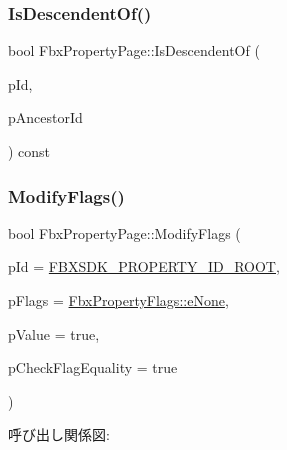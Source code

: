 \subsubsection{\texorpdfstring{Is\+Descendent\+Of()}{IsDescendentOf()}}
{\footnotesize\ttfamily bool Fbx\+Property\+Page\+::\+Is\+Descendent\+Of (\begin{DoxyParamCaption}\item[{\hyperlink{fbxtypes_8h_a088fa96de3b0b3ea69f0f6afef525dfb}{Fbx\+Int}}]{p\+Id,  }\item[{\hyperlink{fbxtypes_8h_a088fa96de3b0b3ea69f0f6afef525dfb}{Fbx\+Int}}]{p\+Ancestor\+Id }\end{DoxyParamCaption}) const}

\mbox{\label{class_fbx_property_page_a74f788300f24f87da57f6e3d7cad5eea}} 
\subsubsection{\texorpdfstring{Modify\+Flags()}{ModifyFlags()}}
{\footnotesize\ttfamily bool Fbx\+Property\+Page\+::\+Modify\+Flags (\begin{DoxyParamCaption}\item[{\hyperlink{fbxtypes_8h_a088fa96de3b0b3ea69f0f6afef525dfb}{Fbx\+Int}}]{p\+Id = {\ttfamily \hyperlink{fbxpropertydef_8h_a291bdb6d8428dce8463143fa3aba2c34}{F\+B\+X\+S\+D\+K\+\_\+\+P\+R\+O\+P\+E\+R\+T\+Y\+\_\+\+I\+D\+\_\+\+R\+O\+OT}},  }\item[{\hyperlink{class_fbx_property_flags_afabfa7e0949aac8a7dcdf8a141867e99}{Fbx\+Property\+Flags\+::\+E\+Flags}}]{p\+Flags = {\ttfamily \hyperlink{class_fbx_property_flags_afabfa7e0949aac8a7dcdf8a141867e99ac1b9aab93d40af76eb419be426de17b1}{Fbx\+Property\+Flags\+::e\+None}},  }\item[{bool}]{p\+Value = {\ttfamily true},  }\item[{bool}]{p\+Check\+Flag\+Equality = {\ttfamily true} }\end{DoxyParamCaption})}

呼び出し関係図\+:
\mbox{\label{class_fbx_property_page_a37f8a46ebab50d047b190e9195af33a4}} 
